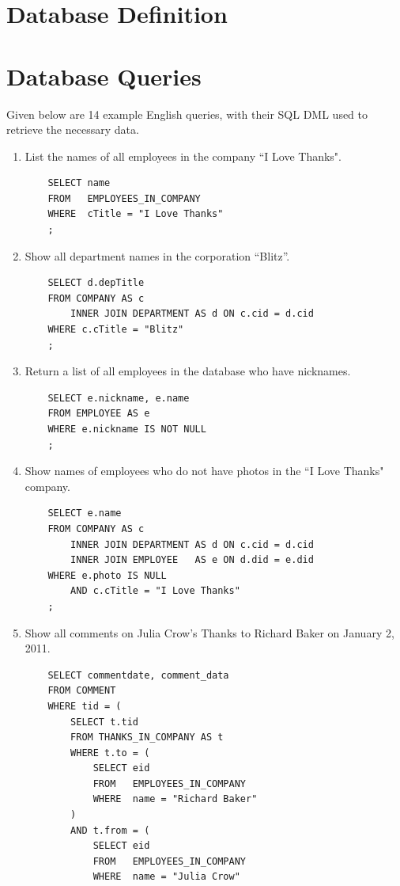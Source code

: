 \documentclass[11pt]{report}
\begin{document}
\section{Database Definition}

\section{Database Queries}
Given below are 14 example English queries, with their SQL DML used to retrieve the necessary data.
\begin{enumerate}
    \item List the names of all employees in the company ``I Love Thanks".
    \begin{verbatim}
    SELECT name
    FROM   EMPLOYEES_IN_COMPANY
    WHERE  cTitle = "I Love Thanks"
    ;
    \end{verbatim}
    \item Show all department names in the corporation ``Blitz''.
    \begin{verbatim}
    SELECT d.depTitle
    FROM COMPANY AS c
        INNER JOIN DEPARTMENT AS d ON c.cid = d.cid
    WHERE c.cTitle = "Blitz"
    ;
    \end{verbatim}
    \item Return a list of all employees in the database who have nicknames.
    \begin{verbatim}
    SELECT e.nickname, e.name
    FROM EMPLOYEE AS e
    WHERE e.nickname IS NOT NULL
    ;
    \end{verbatim}
    \item Show names of employees who do not have photos in the ``I Love Thanks" company.
    \begin{verbatim}
    SELECT e.name
    FROM COMPANY AS c
        INNER JOIN DEPARTMENT AS d ON c.cid = d.cid
        INNER JOIN EMPLOYEE   AS e ON d.did = e.did
    WHERE e.photo IS NULL
        AND c.cTitle = "I Love Thanks"
    ;
    \end{verbatim}
    \item Show all comments on Julia Crow's Thanks to Richard Baker on January 2, 2011.
    \begin{verbatim}
    SELECT commentdate, comment_data
    FROM COMMENT
    WHERE tid = (
        SELECT t.tid
        FROM THANKS_IN_COMPANY AS t
        WHERE t.to = (
            SELECT eid
            FROM   EMPLOYEES_IN_COMPANY
            WHERE  name = "Richard Baker"
        )
        AND t.from = (
            SELECT eid
            FROM   EMPLOYEES_IN_COMPANY
            WHERE  name = "Julia Crow"

\end{verbatim}
\end{enumerate}
\end{document}

